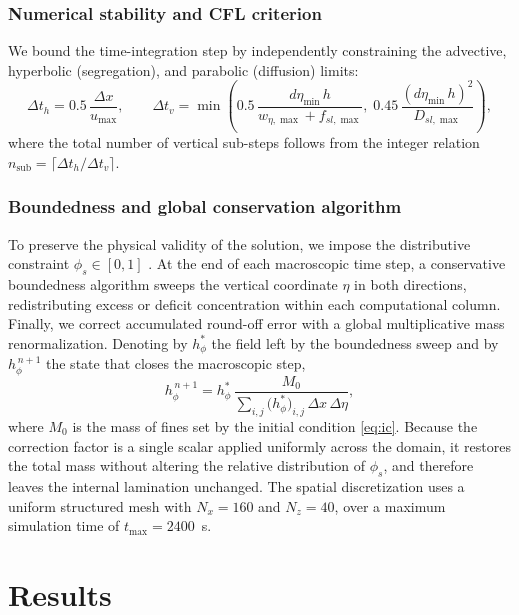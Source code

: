 \documentclass[lineno]{JFM-FLM_Au}
\begin{document}
\subsubsection{Numerical stability and CFL criterion}
\label{sec:cfl}

We bound the time-integration step by independently constraining the advective, hyperbolic (segregation), and parabolic (diffusion) limits:
\begin{equation}
    \Delta t_h = 0.5\, \frac{\Delta x}{u_{\max}}, \qquad
    \Delta t_v = \min\!\left(0.5\, \frac{d\eta_{\min}\, h}{w_{\eta,\max}+f_{sl,\max}},\; 0.45\, \frac{(d\eta_{\min}\, h)^2}{D_{sl,\max}}\right),
    \label{eq:cfl_all}
\end{equation}
where the total number of vertical sub-steps follows from the integer relation $n_{\mathrm{sub}}=\lceil \Delta t_h/\Delta t_v \rceil$.

\subsubsection{Boundedness and global conservation algorithm}
\label{sec:boundedness}

To preserve the physical validity of the solution, we impose the distributive constraint $\phi_s\in[0,1]$ \citep{Jones2018}. At the end of each macroscopic time step, a conservative boundedness algorithm sweeps the vertical coordinate $\eta$ in both directions, redistributing excess or deficit concentration within each computational column. Finally, we correct accumulated round-off error with a global multiplicative mass renormalization. Denoting by $h_\phi^{\ast}$ the field left by the boundedness sweep and by $h_\phi^{\,n+1}$ the state that closes the macroscopic step,
\begin{equation}
    h_\phi^{\,n+1} = h_\phi^{\ast}\, \frac{M_0}{\sum_{i,j} \big(h_\phi^{\ast}\big)_{i,j}\, \Delta x\, \Delta \eta},
    \label{eq:renorm}
\end{equation}
where $M_0$ is the mass of fines set by the initial condition \eqref{eq:ic}. Because the correction factor is a single scalar applied uniformly across the domain, it restores the total mass without altering the relative distribution of $\phi_s$, and therefore leaves the internal lamination unchanged.
The spatial discretization uses a uniform structured mesh with $N_x=160$ and $N_z=40$, over a maximum simulation time of $t_{\max}=2400$~s.

\section{Results}
\label{Sec:results}
\end{document}
